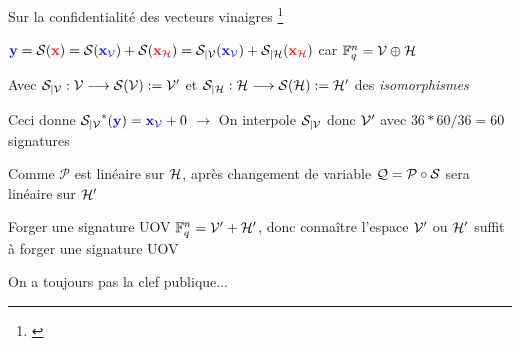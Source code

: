 \newcommand{\xV}{\mathbf{x}_\vin}
\newcommand{\xH}{\mathbf{x}_\hui}
\newcommand{\yV}{\mathbf{y}_{\vin'}}
\newcommand{\yH}{\mathbf{y}_{\hui'}}



\begin{frame}{Sur la confidentialité des vecteurs vinaigres \footnote{\cite{cryptoeprint:2023/1131}}}

    \pause 

    $\mathbf{\k{y}}=\S(\mathbf{\u{x}})=\S(\k{\xV})+\S(\u{\xH})=\sV(\k{\xV})+\sH(\u{\xH})$ car $\mathbb{F}_q^n =\vin\oplus \hui$ 

    Avec $\sV:\vin\longrightarrow \S(\vin):=\vin'$ et $\sH:\hui\longrightarrow \S(\hui):=\hui'$ des \textit{isomorphismes}
    
    \vspace{0.4cm}
    \pause 
    
       Ceci donne $\sV^{*}(\mathbf{\k{y}}) = \mathbf{\k{x_\vin}} + 0$ \pause $\longrightarrow$ On interpole $\sV$ donc $\vin'$ avec $36*60/36=60$ signatures

    \vspace{0.4cm}
    \pause
    Comme $\mathcal{P}$ est linéaire sur $\hui$, après changement de variable $\mathcal{Q}=\mathcal{P}\circ \S$ sera linéaire sur $\hui'$

    \begin{block}{Forger une signature UOV}
         $\mathbb{F}_q^n =\vin' + \hui'$, donc connaître l'espace $\vin'$ ou $\hui'$ suffit à forger une signature UOV
    \end{block}


    \vfill
   \pause

   On a toujours pas la clef publique...
\end{frame}


